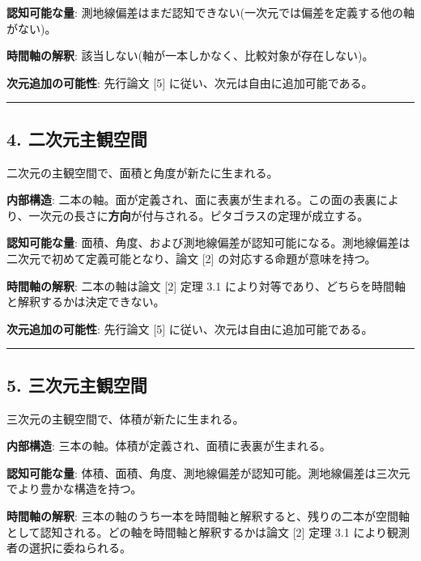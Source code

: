 \documentclass[a4paper,11pt]{ltjsarticle}
\theoremstyle{definition}
\begin{document}
\textbf{認知可能な量}: 測地線偏差はまだ認知できない(一次元では偏差を定義する他の軸がない)。

\textbf{時間軸の解釈}: 該当しない(軸が一本しかなく、比較対象が存在しない)。

\textbf{次元追加の可能性}: 先行論文 {[}5{]} に従い、次元は自由に追加可能である。

\begin{center}\rule{0.5\linewidth}{0.5pt}\end{center}

\subsection{4. 二次元主観空間}\label{ux4e8cux6b21ux5143ux4e3bux89b3ux7a7aux9593}

二次元の主観空間で、面積と角度が新たに生まれる。

\textbf{内部構造}: 二本の軸。面が定義され、面に表裏が生まれる。この面の表裏により、一次元の長さに\textbf{方向}が付与される。ピタゴラスの定理が成立する。

\textbf{認知可能な量}: 面積、角度、および測地線偏差が認知可能になる。測地線偏差は二次元で初めて定義可能となり、論文 {[}2{]} の対応する命題が意味を持つ。

\textbf{時間軸の解釈}: 二本の軸は論文 {[}2{]} 定理 3.1 により対等であり、どちらを時間軸と解釈するかは決定できない。

\textbf{次元追加の可能性}: 先行論文 {[}5{]} に従い、次元は自由に追加可能である。

\begin{center}\rule{0.5\linewidth}{0.5pt}\end{center}

\subsection{5. 三次元主観空間}\label{ux4e09ux6b21ux5143ux4e3bux89b3ux7a7aux9593}

三次元の主観空間で、体積が新たに生まれる。

\textbf{内部構造}: 三本の軸。体積が定義され、面積に表裏が生まれる。

\textbf{認知可能な量}: 体積、面積、角度、測地線偏差が認知可能。測地線偏差は三次元でより豊かな構造を持つ。

\textbf{時間軸の解釈}: 三本の軸のうち一本を時間軸と解釈すると、残りの二本が空間軸として認知される。どの軸を時間軸と解釈するかは論文 {[}2{]} 定理 3.1 により観測者の選択に委ねられる。
\end{document}
